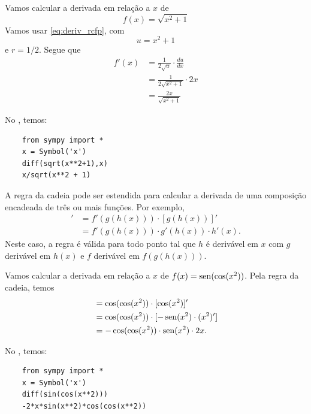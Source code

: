 \begin{ex}
  Vamos calcular a derivada em relação a $x$ de
  \begin{equation}
    f(x) = \sqrt{x^2+1}
  \end{equation}
  Vamos usar \eqref{eq:deriv_rcfp}, com
  \begin{equation}
    u = x^2 + 1
  \end{equation}
  e $r = 1/2$. Segue que
  \begin{align}
    f'(x) &= \frac{1}{2\sqrt{u}}\cdot \frac{d u}{d x} \\
          &= \frac{1}{2\sqrt{x^2+1}}\cdot 2x\\
          &= \frac{2x}{\sqrt{x^2+1}}
  \end{align}

  \ifispython
  No \sympy, temos:
\begin{lstlisting}
    from sympy import *
    x = Symbol('x')
    diff(sqrt(x**2+1),x)
    x/sqrt(x**2 + 1)
  \end{lstlisting}
  \fi  
\end{ex}

A regra da cadeia pode ser estendida para calcular a derivada de uma composição encadeada de três ou mais funções. Por exemplo,
\begin{align}
  [f(g(h(x)))]' &= f'(g(h(x)))\cdot[g(h(x))]' \\
                &= f'(g(h(x)))\cdot g'(h(x))\cdot h'(x).
\end{align}
Neste caso, a regra é válida para todo ponto tal que $h$ é derivável em $x$ com $g$ derivável em $h(x)$ e $f$ derivável em $f(g(h(x)))$.

\begin{ex}
  Vamos calcular a derivada em relação a $x$ de $f(x) = \operatorname{sen}(\cos(x^2))$. Pela regra da cadeia, temos
  \begin{align}
    [\sen(\cos(x^2))] &= \cos(\cos(x^2))\cdot[\cos(x^2)]' \\
                    &= \cos(\cos(x^2))\cdot [-\sen(x^2)\cdot (x^2)'] \\
                    &= -\cos(\cos(x^2))\cdot\sen(x^2)\cdot 2x.
  \end{align}

  \ifispython
  No \sympy, temos:
  \begin{lstlisting}
    from sympy import *
    x = Symbol('x')
    diff(sin(cos(x**2)))
    -2*x*sin(x**2)*cos(cos(x**2))
  \end{lstlisting}
  \fi  
\end{ex}

